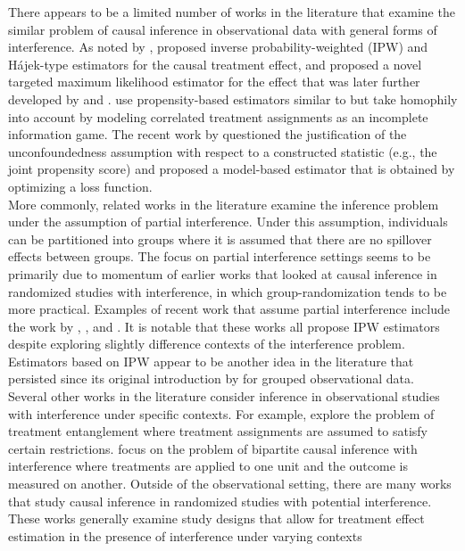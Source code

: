 \documentclass[10pt]{article}
\begin{document}
There appears to be a limited number of works in the literature that examine the similar problem of causal inference in observational data with general forms of interference. As noted by \citeauthor{Forastiere:2021}, \textcite{Liu:2016} proposed inverse probability-weighted (IPW) and H\'{a}jek-type estimators for the causal treatment effect, and \textcite{VanDerLaan:2014} proposed a novel targeted maximum likelihood estimator for the effect that was later further developed by \textcite{Sofrygin:2017} and \textcite{Ogburn:2017}. \textcite{Jackson:2020} use propensity-based estimators similar to \textcite{Forastiere:2021} but take homophily into account by modeling correlated treatment assignments as an incomplete information game. The recent work by \textcite{Sanchez:2021} questioned the justification of the unconfoundedness assumption with respect to a constructed statistic (e.g., the joint propensity score) and proposed a model-based estimator that is obtained by optimizing a loss function. \todo
\\

More commonly, related works in the literature examine the inference problem under the assumption of partial interference. Under this assumption, individuals can be partitioned into groups where it is assumed that there are no spillover effects between groups. The focus on partial interference settings seems to be primarily due to momentum of earlier works \parencite[e.g.,][]{Sobel:2006,Hudgens:2008} that looked at causal inference in randomized studies with interference, in which group-randomization tends to be more practical. Examples of recent work that assume partial interference include the work by \textcite{Liu:2019}, \textcite{Barkley:2020}, and \textcite{Qu:2021}. It is notable that these works all propose IPW estimators despite exploring slightly difference contexts of the interference problem. Estimators based on IPW appear to be another idea in the literature that persisted since its original introduction by \textcite{Tchetgen:2012} for grouped observational data.
\\

Several other works in the literature consider inference in observational studies with interference under specific contexts. For example, \textcite{Toulis:2018} explore the problem of treatment entanglement where treatment assignments are assumed to satisfy certain restrictions. \textcite{Zigler:2021} focus on the problem of bipartite causal inference with interference where treatments are applied to one unit and the outcome is measured on another. Outside of the observational setting, there are many works that study causal inference in randomized studies with potential interference. These works generally examine study designs that allow for treatment effect estimation in the presence of interference under varying contexts \parencite[e.g.,][]{Saveski:2017,Jagadeesan:2020,Imai:2021,Doudchenko:2020}
\end{document}
